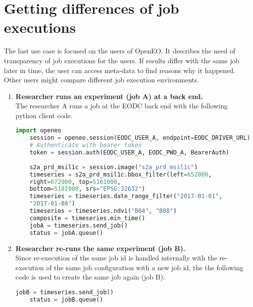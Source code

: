 \documentclass[draft,final]{vutinfth} %
\begin{document}
\section{Getting differences of job executions}\label{Evaluation:Use Case3}
The last use case is focused on the users of OpenEO. It describes the need of transparency of job executions for the users. If results differ with the same job later in time, the user can access meta-data to find reasons why it happened. Other users might compare different job execution environments.  
\begin{enumerate}
	\item \textbf{Researcher runs an experiment (job A) at a back end.}\\
	The researcher A runs a job at the EODC back end with the following python client code. 
	\begin{lstlisting}[frame=single, language=Python]
	import openeo
	session = openeo.session(EODC_USER_A, endpoint=EODC_DRIVER_URL)
	# Authenticate with bearer token
	token = session.auth(EODC_USER_A, EODC_PWD_A, BearerAuth)
	
	s2a_prd_msil1c = session.image("s2a_prd_msil1c")
	timeseries = s2a_prd_msil1c.bbox_filter(left=652000, 
	right=672000, top=5161000,
	bottom=5181000, srs="EPSG:32632")
	timeseries = timeseries.date_range_filter("2017-01-01", 
	"2017-01-08")
	timeseries = timeseries.ndvi("B04", "B08")
	composite = timeseries.min_time()
	jobA = timeseries.send_job()
	status = jobA.queue()
	\end{lstlisting}
	\item \textbf{Researcher re-runs the same experiment (job B).}\\
	Since re-execution of the same job id is handled internally with the re-execution of the same job configuration with a new job id, the the following code is used to create the same job again (job B):
	\begin{lstlisting}[frame=single, language=Python]
	jobB = timeseries.send_job()
	status = jobB.queue()
	\end{lstlisting}
	

\end{enumerate}
\end{document}
